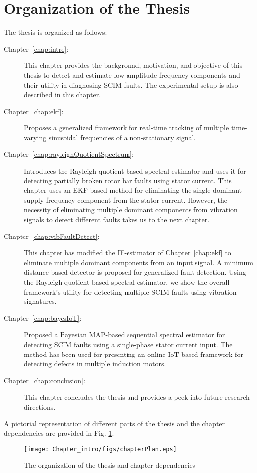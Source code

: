 \section{Organization of the Thesis}
The thesis is organized as follows:
\begin{description}
	\item [Chapter~\ref{chap:intro}:] This chapter provides the background, motivation, and objective of this thesis to detect and estimate low-amplitude frequency components and their utility in diagnosing SCIM faults. The experimental setup is also described in this chapter. 
	\item [Chapter~\ref{chap:ekf}:] Proposes a generalized framework for real-time tracking of multiple time-varying sinusoidal frequencies of a non-stationary signal. 
	\item [Chapter~\ref{chap:rayleighQuotientSpectrum}:] Introduces the Rayleigh-quotient-based spectral estimator and uses it for detecting partially broken rotor bar faults using stator current. This chapter uses an EKF-based method for eliminating the single dominant supply frequency component from the stator current. However, the necessity of eliminating multiple dominant components from vibration signals to detect different faults takes us to the next chapter.  
	\item [Chapter~\ref{chap:vibFaultDetect}:] This chapter has modified the IF-estimator of Chapter~\ref{chap:ekf} to eliminate multiple dominant components from an input signal. A minimum distance-based detector is proposed for generalized fault detection. Using the Rayleigh-quotient-based spectral estimator, we show the overall framework's utility for detecting multiple SCIM faults using vibration signatures. 
	\item [Chapter~\ref{chap:bayesIoT}:] Proposed a Bayesian MAP-based sequential spectral estimator for detecting SCIM faults using a single-phase stator current input. The method has been used for presenting an online IoT-based framework for detecting defects in multiple induction motors. 
	\item [Chapter~\ref{chap:conclusion}:] This chapter concludes the thesis and provides a peek into future research directions. 
\end{description}
A pictorial representation of different parts of the thesis and the chapter dependencies are provided in Fig. \ref{fig:chapMap}. \begin{figure}[h] \centering
	{\texttt{[image: Chapter\_intro/figs/chapterPlan.eps]}}
	\caption{The organization of the thesis and chapter dependencies} \label{fig:chapMap}
\end{figure}